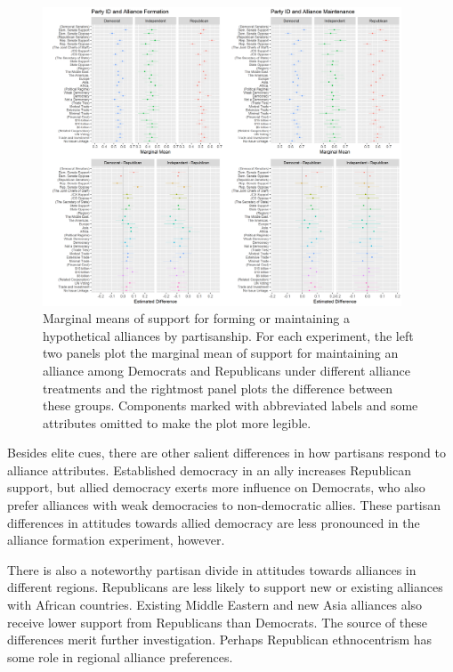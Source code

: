 \documentclass[12pt]{article}
\begin{document}
\begin{figure}
	\centering
		\includegraphics[width=0.95\textwidth]{joint-part-plots.png}
	\caption{Marginal means of support for forming or maintaining a hypothetical alliances by partisanship. For each experiment, the left two panels plot the marginal mean of support for maintaining an alliance among Democrats and Republicans under different alliance treatments and the rightmost panel plots the difference between these groups. Components marked with abbreviated labels and some attributes omitted to make the plot more legible.}
	\label{fig:joint-part-plots}
\end{figure}


Besides elite cues, there are other salient differences in how partisans respond to alliance attributes.
Established democracy in an ally increases Republican support, but allied democracy exerts more influence on Democrats, who also prefer alliances with weak democracies to non-democratic allies. 
These partisan differences in attitudes towards allied democracy are less pronounced in the alliance formation experiment, however. 


There is also a noteworthy partisan divide in attitudes towards alliances in different regions.
Republicans are less likely to support new or existing alliances with African countries. 
Existing Middle Eastern and new Asia alliances also receive lower support from Republicans than Democrats.
The source of these differences merit further investigation. 
Perhaps Republican ethnocentrism has some role in regional alliance preferences. 
\end{document}
